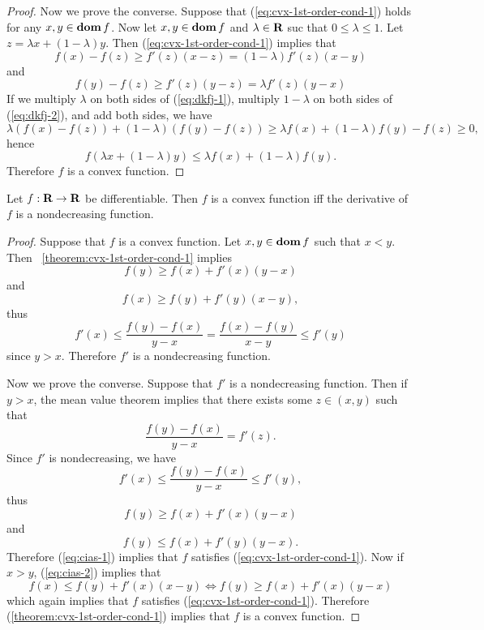 \documentclass[10pt, twoside]{book}   	%
\begin{document}
\begin{proof}
Now we prove the converse.
Suppose that (\ref{eq:cvx-1st-order-cond-1}) holds for any $x,y\in\mathop{\bf dom} f$.
Now let $x,y\in\mathop{\bf dom} f$ and $\lambda \in {\mbox{\bf R}}$ suc that $0\leq \lambda \leq 1$.
Let $z=\lambda x + (1-\lambda) y$. Then (\ref{eq:cvx-1st-order-cond-1}) implies that
\begin{equation}
\label{eq:dkfj-1}
f(x) - f(z) \geq f'(z) (x-z) = (1-\lambda) f'(z) (x-y)
\end{equation}
and
\begin{equation}
\label{eq:dkfj-2}
f(y) - f(z) \geq f'(z) (y-z) = \lambda f'(z) (y-x)
\end{equation}
If we multiply $\lambda$ on both sides of (\ref{eq:dkfj-1}),
multiply $1-\lambda$ on both sides of (\ref{eq:dkfj-2}),
and add both sides, we have
\[
\lambda(f(x) - f(z)) + (1-\lambda) (f(y) - f(z))
\geq \lambda f(x) +(1-\lambda) f(y) - f(z) \geq 0,
\]
hence
\[
f(\lambda x + (1-\lambda) y)
\leq \lambda f(x) + (1-\lambda) f(y).
\]
Therefore $f$ is a convex function.
\end{proof}

\begin{corollary}
\label{corollary:cvx-deriv-non-decreasing}
Let $f:{\mbox{\bf R}}\to{\mbox{\bf R}}$ be differentiable. Then $f$ is a convex function iff the derivative of $f$ is a nondecreasing function.
\end{corollary}
\begin{proof}
Suppose that $f$ is a convex function.
Let $x,y\in\mathop{\bf dom} f$ such that $x<y$.
Then \theoremname~\ref{theorem:cvx-1st-order-cond-1} implies
\[
f(y) \geq f(x) + f'(x)(y-x)
\]
and
\[
f(x) \geq f(y) + f'(y)(x-y),
\]
thus
\[
f'(x) \leq \frac{f(y)-f(x)}{y-x}
= \frac{f(x)-f(y)}{x-y} \leq f'(y)
\]
since $y>x$.
Therefore $f'$ is a nondecreasing function.

Now we prove the converse. Suppose that $f'$ is a nondecreasing function.
Then if $y>x$, the mean value theorem implies that there exists some $z \in (x,y)$ such that
\[
\frac{f(y)-f(x)}{y-x} = f'(z).
\]
Since $f'$ is nondecreasing, we have
\[
f'(x) \leq \frac{f(y)-f(x)}{y-x} \leq f'(y),
\]
thus
\begin{equation}
\label{eq:cias-1}
f(y) \geq f(x) + f'(x)(y-x)
\end{equation}
and
\begin{equation}
\label{eq:cias-2}
f(y) \leq f(x) + f'(y)(y-x).
\end{equation}
Therefore (\ref{eq:cias-1}) implies that $f$ satisfies (\ref{eq:cvx-1st-order-cond-1}).
Now if $x>y$, (\ref{eq:cias-2}) implies that
\[
f(x) \leq f(y) + f'(x)(x-y)
\Leftrightarrow
f(y) \geq f(x) + f'(x)(y-x)
\]
which again implies that $f$ satisfies (\ref{eq:cvx-1st-order-cond-1}).
Therefore (\ref{theorem:cvx-1st-order-cond-1}) implies that $f$ is a convex function.
\end{proof}
\end{document}
